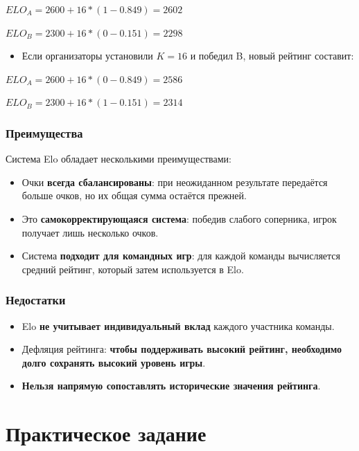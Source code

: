 \documentclass[11pt,a4paper]{article}
\begin{document}
\(ELO_A = 2600 + 16*(1-0.849) = 2602\)

\(ELO_B = 2300 + 16*(0-0.151) = 2298\)

\begin{itemize}
\tightlist
\item
  Если организаторы установили $K=16$ и победил B, новый рейтинг составит:
\end{itemize}

\(ELO_A = 2600 + 16*(0-0.849) = 2586\)

\(ELO_B = 2300 + 16 *(1-0.151) = 2314\)

\subsubsection{Преимущества}\label{the-advantages}

Система Elo обладает несколькими преимуществами:

\begin{itemize}
\tightlist
\item
  Очки \textbf{всегда сбалансированы}: при неожиданном результате передаётся больше очков, но их общая сумма остаётся прежней.
\item
  Это \textbf{самокорректирующаяся система}: победив слабого соперника, игрок получает лишь несколько очков.
\item
  Система \textbf{подходит для командных игр}: для каждой команды вычисляется средний рейтинг, который затем используется в Elo.
\end{itemize}

\subsubsection{Недостатки}\label{the-disadvantages}

\begin{itemize}
\tightlist
\item
  Elo \textbf{не учитывает индивидуальный вклад} каждого участника команды.
\item
  Дефляция рейтинга: \textbf{чтобы поддерживать высокий рейтинг, необходимо долго сохранять высокий уровень игры}.
\item
  \textbf{Нельзя напрямую сопоставлять исторические значения рейтинга}.
\end{itemize}

\section{Практическое задание}\label{hands-on}
\end{document}
